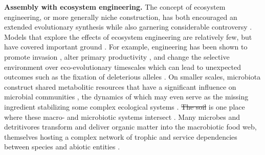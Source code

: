 \documentclass[twocolumn,preprintnumbers,amsmath,amssymb,superscriptaddress,linenumbers]{revtex4-1}
\providecommand{\DIFadd}[1]{{\protect\color{blue}\uwave{#1}}} %
\providecommand{\DIFdel}[1]{{\protect\color{red}\sout{#1}}}                      %
\providecommand{\DIFaddbegin}{} %
\providecommand{\DIFaddend}{} %
\providecommand{\DIFdelbegin}{} %
\providecommand{\DIFdelend}{} %
\newcommand{\DIFscaledelfig}{0.5}
\newlength{\DIFdelgraphicswidth} %
\newlength{\DIFdelgraphicsheight} %
\newcommand{\DIFaddincludegraphics}[2][]{{\color{blue}\fbox{\DIFOincludegraphics[#1]{#2}}}} %
\newcommand{\DIFdelincludegraphics}[2][]{%
\sbox{\DIFdelgraphicsbox}{\DIFOincludegraphics[#1]{#2}}%
\settoboxwidth{\DIFdelgraphicswidth}{\DIFdelgraphicsbox} %
\settoboxtotalheight{\DIFdelgraphicsheight}{\DIFdelgraphicsbox} %
\scalebox{\DIFscaledelfig}{%
\parbox[b]{\DIFdelgraphicswidth}{\usebox{\DIFdelgraphicsbox}\\[-\baselineskip] \rule{\DIFdelgraphicswidth}{0em}}\llap{\resizebox{\DIFdelgraphicswidth}{\DIFdelgraphicsheight}{%
\setlength{\unitlength}{\DIFdelgraphicswidth}%
\begin{picture}(1,1)%
\thicklines\linethickness{2pt} %
{\color[rgb]{1,0,0}\put(0,0){\framebox(1,1){}}}%
{\color[rgb]{1,0,0}\put(0,0){\line( 1,1){1}}}%
{\color[rgb]{1,0,0}\put(0,1){\line(1,-1){1}}}%
\end{picture}%
}\hspace*{3pt}}} %
} %
\DeclareRobustCommand{\DIFaddbegin}{\DIFOaddbegin \let\includegraphics\DIFaddincludegraphics} %
\DeclareRobustCommand{\DIFaddend}{\DIFOaddend \let\includegraphics\DIFOincludegraphics} %
\DeclareRobustCommand{\DIFdelbegin}{\DIFOdelbegin \let\includegraphics\DIFdelincludegraphics} %
\DeclareRobustCommand{\DIFdelend}{\DIFOaddend \let\includegraphics\DIFOincludegraphics} %
\begin{document}
\vspace{0mm}
\noindent \textbf{Assembly with ecosystem engineering.}
The concept of ecosystem engineering, or more generally niche construction, has both encouraged an extended evolutionary synthesis \cite{Laland2015} while also garnering considerable controversy \cite{Gupta2017,Feldman2017}.
Models that explore the effects of ecosystem engineering are relatively few, but have covered important ground \cite{Hastings2007,OdlingSmee2013}.
For example, engineering has been shown to promote invasion \cite{Cuddington2004}, alter primary productivity \cite{Wright2004}, and change the selective environment over eco-evolutionary timescales \cite{Kylafis2008,Krakauer2009} which can lead to unexpected outcomes such as the fixation of deleterious alleles \cite{Laland1999}.
On smaller scales, microbiota construct shared metabolitic resources that have a significant influence on microbial communities \cite{Kallus2017}, the dynamics of which may even serve as the missing ingredient stabilizing some complex ecological systems \cite{Butler2018}.
\DIFdelbegin \DIFdel{The soil }\DIFdelend \DIFaddbegin \DIFadd{Soil }\DIFaddend is one place where these macro- and microbiotic systems intersect \cite{Amundson2015}.
Many microbes and detritivores transform and deliver organic matter into the macrobiotic food web, themselves hosting a complex network of trophic and service dependencies between species and abiotic entities \cite{Gutierrez2006,Jouquet2006}.
\end{document}
